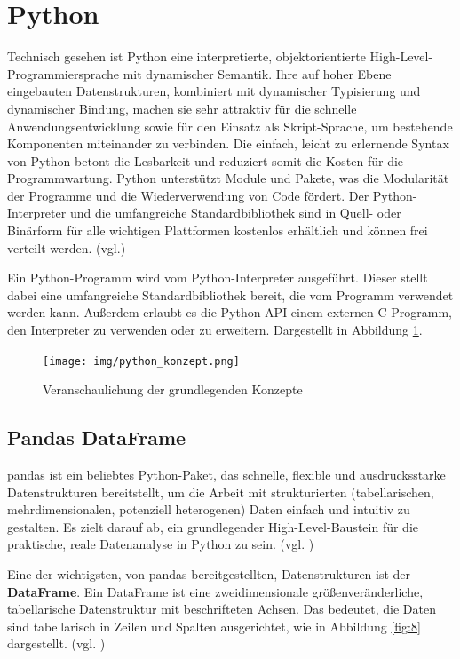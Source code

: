 \documentclass[oneside]{ausarbeitung}
\begin{document}
\section{Python}
\label{sec:python}

Technisch gesehen ist Python eine interpretierte, objektorientierte
High-Level-Programmiersprache mit dynamischer Semantik. Ihre auf hoher
Ebene eingebauten Datenstrukturen, kombiniert mit dynamischer
Typisierung und dynamischer Bindung, machen sie sehr attraktiv für
die schnelle Anwendungsentwicklung sowie für den Einsatz als
Skript-Sprache, um bestehende Komponenten miteinander zu verbinden.
Die einfach, leicht zu erlernende Syntax von Python betont die
Lesbarkeit und reduziert somit die Kosten für die Programmwartung.
Python unterstützt Module und Pakete, was die Modularität der
Programme und die Wiederverwendung von Code fördert. Der
Python-Interpreter und die umfangreiche Standardbibliothek sind in
Quell- oder Binärform für alle wichtigen Plattformen kostenlos
erhältlich und können frei verteilt werden. 
(vgl.\cite{python_definition})

Ein Python-Programm wird vom Python-Interpreter ausgeführt. Dieser
stellt dabei eine umfangreiche Standardbibliothek bereit, die vom
Programm verwendet werden kann. Außerdem erlaubt es die Python API
einem externen C-Programm, den Interpreter zu verwenden oder zu
erweitern. Dargestellt in Abbildung \ref{fig:6}.

\begin{figure}[H]
  \centering
  \texttt{[image: img/python\_konzept.png]}
  \caption{Veranschaulichung der grundlegenden Konzepte\cite{python_konzepte}}
  \label{fig:6}
\end{figure}

\subsection{Pandas DataFrame}
\label{sub:dataframe}

\ac{pandas} ist ein beliebtes Python-Paket, das schnelle, flexible und ausdrucksstarke Datenstrukturen bereitstellt, um die Arbeit mit strukturierten (tabellarischen, mehrdimensionalen, potenziell heterogenen) Daten einfach und intuitiv zu gestalten. Es zielt darauf ab, ein grundlegender High-Level-Baustein für die praktische, reale Datenanalyse in Python zu sein. (vgl. \cite{pandas_definition})

Eine der wichtigsten, von pandas bereitgestellten, Datenstrukturen ist der \textbf{DataFrame}. Ein DataFrame ist eine zweidimensionale größenveränderliche, tabellarische Datenstruktur mit beschrifteten Achsen. Das bedeutet, die Daten sind tabellarisch in Zeilen und Spalten ausgerichtet, wie in Abbildung \ref{fig:8} dargestellt. (vgl. \cite{dataframe_example})
\end{document}
